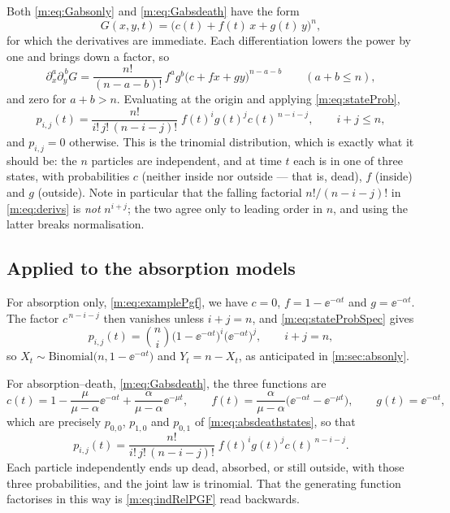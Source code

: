 Both \cref{m:eq:Gabsonly} and \cref{m:eq:Gabsdeath} have the form
\begin{equation}
\label{m:eq:multilinear}
G(x,y,t) = \bigl(c(t) + f(t)\,x + g(t)\,y\bigr)^n ,
\end{equation}
for which the derivatives are immediate. Each differentiation lowers the power by
one and brings down a factor, so
\begin{equation}
\label{m:eq:derivs}
\partial_x^{a}\partial_y^{\,b}G
= \frac{n!}{(n-a-b)!}\,f^{a}g^{b}\bigl(c+fx+gy\bigr)^{n-a-b}
\qquad(a+b\le n),
\end{equation}
and zero for $a+b>n$. Evaluating at the origin and applying \cref{m:eq:stateProb},
\begin{equation}
\label{m:eq:stateProbSpec}
p_{i,j}(t) = \frac{n!}{i!\,j!\,(n-i-j)!}\;f(t)^{i}g(t)^{j}c(t)^{\,n-i-j},
\qquad i+j\le n,
\end{equation}
and $p_{i,j}=0$ otherwise. This is the trinomial distribution, which is exactly
what it should be: the $n$ particles are independent, and at time $t$ each is in
one of three states, with probabilities $c$ (neither inside nor outside --- that
is, dead), $f$ (inside) and $g$ (outside). Note in particular that the falling
factorial $n!/(n-i-j)!$ in \cref{m:eq:derivs} is \emph{not} $n^{i+j}$; the two agree
only to leading order in $n$, and using the latter breaks normalisation.

\subsection*{Applied to the absorption models}

For absorption only, \cref{m:eq:examplePgf}, we have $c=0$, $f = 1-\ee^{-\alpha t}$
and $g = \ee^{-\alpha t}$. The factor $c^{\,n-i-j}$ then vanishes unless $i+j=n$,
and \cref{m:eq:stateProbSpec} gives
\begin{equation*}
p_{i,j}(t) = \binom{n}{i}\bigl(1-\ee^{-\alpha t}\bigr)^{i}\bigl(\ee^{-\alpha t}\bigr)^{j},
\qquad i+j=n,
\end{equation*}
so $X_t\sim\text{Binomial}\bigl(n,1-\ee^{-\alpha t}\bigr)$ and $Y_t = n-X_t$, as
anticipated in \cref{m:sec:absonly}.

For absorption--death, \cref{m:eq:Gabsdeath}, the three functions are
\begin{equation*}
c(t) = 1-\frac{\mu}{\mu-\alpha}\ee^{-\alpha t} + \frac{\alpha}{\mu-\alpha}\ee^{-\mu t},
\qquad
f(t) = \frac{\alpha}{\mu-\alpha}\bigl(\ee^{-\alpha t}-\ee^{-\mu t}\bigr),
\qquad
g(t) = \ee^{-\alpha t},
\end{equation*}
which are precisely $p_{0,0}$, $p_{1,0}$ and $p_{0,1}$ of
\cref{m:eq:absdeathstates}, so that
\begin{equation*}
p_{i,j}(t) = \frac{n!}{i!\,j!\,(n-i-j)!}\;f(t)^{i}g(t)^{j}c(t)^{\,n-i-j} .
\end{equation*}
Each particle independently ends up dead, absorbed, or still outside, with those
three probabilities, and the joint law is trinomial. That the generating function
factorises in this way is \cref{m:eq:indRelPGF} read backwards.

